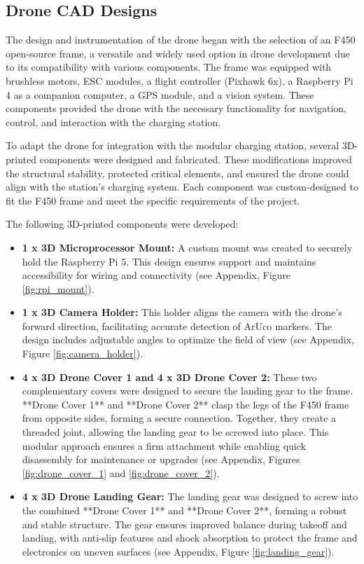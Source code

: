     \subsection{Drone CAD Designs} 
        The design and instrumentation of the drone began with the selection of an F450 open-source frame, a versatile and widely used option in drone development due to its compatibility with various components. The frame was equipped with brushless motors, ESC modules, a flight controller (Pixhawk 6x), a Raspberry Pi 4 as a companion computer, a GPS module, and a vision system. These components provided the drone with the necessary functionality for navigation, control, and interaction with the charging station.

        To adapt the drone for integration with the modular charging station, several 3D-printed components were designed and fabricated. These modifications improved the structural stability, protected critical elements, and ensured the drone could align with the station's charging system. Each component was custom-designed to fit the F450 frame and meet the specific requirements of the project.

        The following 3D-printed components were developed:

        \begin{itemize} 
            \item \textbf{1 x 3D Microprocessor Mount:}  
            A custom mount was created to securely hold the Raspberry Pi 5. This design ensures support and maintains accessibility for wiring and connectivity (see Appendix, Figure \ref{fig:rpi_mount}).
            
            \item \textbf{1 x 3D Camera Holder:}  
            This holder aligns the camera with the drone's forward direction, facilitating accurate detection of ArUco markers. The design includes adjustable angles to optimize the field of view (see Appendix, Figure \ref{fig:camera_holder}).

            \item \textbf{4 x 3D Drone Cover 1 and 4 x 3D Drone Cover 2:}  
            These two complementary covers were designed to secure the landing gear to the frame. **Drone Cover 1** and **Drone Cover 2** clasp the legs of the F450 frame from opposite sides, forming a secure connection. Together, they create a threaded joint, allowing the landing gear to be screwed into place. This modular approach ensures a firm attachment while enabling quick disassembly for maintenance or upgrades (see Appendix, Figures \ref{fig:drone_cover_1} and \ref{fig:drone_cover_2}).

            \item \textbf{4 x 3D Drone Landing Gear:}  
            The landing gear was designed to screw into the combined **Drone Cover 1** and **Drone Cover 2**, forming a robust and stable structure. The gear ensures improved balance during takeoff and landing, with anti-slip features and shock absorption to protect the frame and electronics on uneven surfaces (see Appendix, Figure \ref{fig:landing_gear}).
        \end{itemize}

